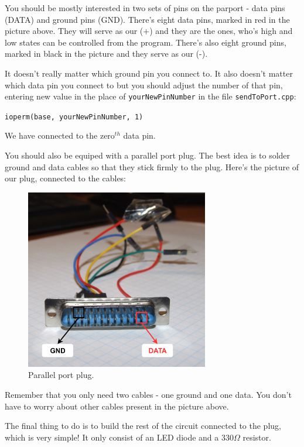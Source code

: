 \documentclass[12pt]{report}
\begin{document}
You should be mostly interested in two sets of pins on the parport - data pins (DATA) and ground pins (GND). There's eight data pins, marked in red in the picture above. They will serve as our (+) and they are the ones, who's high and low states can be controlled from the program. There's also eight ground pins, marked in black in the picture and they serve as our (-).

It doesn't really matter which ground pin you connect to. It also doesn't matter which data pin you connect to but you should adjust the number of that pin, entering new value in the place of \verb|yourNewPinNumber| in the file \verb|sendToPort.cpp|:

\begin{snugshade}
\verb|ioperm(base, yourNewPinNumber, 1)|
\end{snugshade}


We have connected to the zero$^{th}$ data pin.

You should also be equiped with a parallel port plug. The best idea is to solder ground and data cables so that they stick firmly to the plug. Here's the picture of our plug, connected to the cables:

\begin{figure}[H]
\centering\includegraphics[width=8cm]{parport_plug}
\caption{Parallel port plug.}				
\label{fig:parport_plug}
\end{figure}

Remember that you only need two cables - one ground and one data. You don't have to worry about other cables present in the picture above.

The final thing to do is to build the rest of the circuit connected to the plug, which is very simple! It only consist of an LED diode and a 330$\Omega$ resistor.
\end{document}
